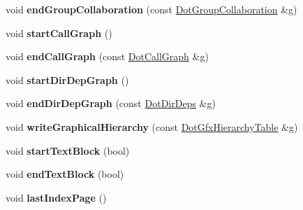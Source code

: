 \begin{DoxyCompactItemize}
\item 
\hypertarget{class_html_generator_abf4d1f5c7a6de661874865317e848973}{void {\bfseries end\-Group\-Collaboration} (const \hyperlink{class_dot_group_collaboration}{Dot\-Group\-Collaboration} \&g)}\label{class_html_generator_abf4d1f5c7a6de661874865317e848973}

\item 
\hypertarget{class_html_generator_a8b9ae07c2a7ca51c0100e5258c16b663}{void {\bfseries start\-Call\-Graph} ()}\label{class_html_generator_a8b9ae07c2a7ca51c0100e5258c16b663}

\item 
\hypertarget{class_html_generator_acdc4833b30336e37e5d0940e49595b70}{void {\bfseries end\-Call\-Graph} (const \hyperlink{class_dot_call_graph}{Dot\-Call\-Graph} \&g)}\label{class_html_generator_acdc4833b30336e37e5d0940e49595b70}

\item 
\hypertarget{class_html_generator_a071f06d58679ecf7077e1bb4335b798c}{void {\bfseries start\-Dir\-Dep\-Graph} ()}\label{class_html_generator_a071f06d58679ecf7077e1bb4335b798c}

\item 
\hypertarget{class_html_generator_a074b02c465c6db3a6252095c906511ab}{void {\bfseries end\-Dir\-Dep\-Graph} (const \hyperlink{class_dot_dir_deps}{Dot\-Dir\-Deps} \&g)}\label{class_html_generator_a074b02c465c6db3a6252095c906511ab}

\item 
\hypertarget{class_html_generator_ade237967fa53c8c01a1477ebe3fe79e9}{void {\bfseries write\-Graphical\-Hierarchy} (const \hyperlink{class_dot_gfx_hierarchy_table}{Dot\-Gfx\-Hierarchy\-Table} \&g)}\label{class_html_generator_ade237967fa53c8c01a1477ebe3fe79e9}

\item 
\hypertarget{class_html_generator_ae8ef4194fc15fa0d64074879660110f0}{void {\bfseries start\-Text\-Block} (bool)}\label{class_html_generator_ae8ef4194fc15fa0d64074879660110f0}

\item 
\hypertarget{class_html_generator_a478d722be3ebb3a3c0974f9f840a80e8}{void {\bfseries end\-Text\-Block} (bool)}\label{class_html_generator_a478d722be3ebb3a3c0974f9f840a80e8}

\item 
\hypertarget{class_html_generator_a9fcbfbb9afd01da287ac464c1da0d778}{void {\bfseries last\-Index\-Page} ()}\label{class_html_generator_a9fcbfbb9afd01da287ac464c1da0d778}


\end{DoxyCompactItemize}
